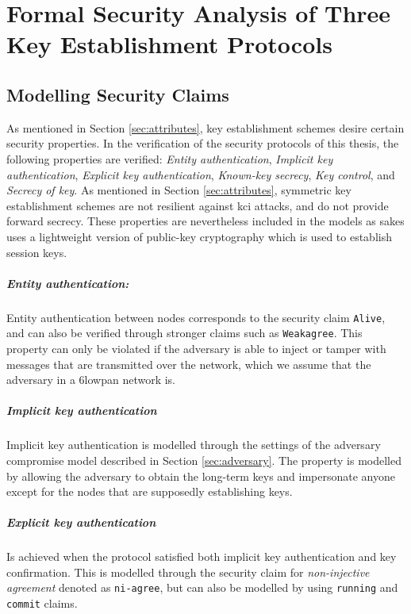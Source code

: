 \chapter{Formal Security Analysis of Three Key Establishment Protocols}
\label{chp:analysis}


\section{Modelling Security Claims}

As mentioned in Section \ref{sec:attributes}, key establishment schemes desire certain security properties. In the verification of the security protocols of this thesis, the following properties are verified: \emph{Entity authentication}, \emph{Implicit key authentication}, \emph{Explicit key authentication}, \emph{Known-key secrecy}, \emph{Key control}, and \emph{Secrecy of key}. As mentioned in Section \ref{sec:attributes}, symmetric key establishment schemes are not resilient against \gls{kci} attacks, and do not provide forward secrecy. These properties are nevertheless included in the models as \gls{sakes} uses a lightweight version of public-key cryptography which is used to establish session keys.

\paragraph{Entity authentication:} Entity authentication between nodes corresponds to the security claim \texttt{Alive}, and can also be verified through stronger claims such as \texttt{Weakagree}. This property can only be violated if the adversary is able to inject or tamper with messages that are transmitted over the network, which we assume that the adversary in a \gls{6lowpan} network is.

\paragraph{Implicit key authentication} Implicit key authentication is modelled through the settings of the adversary compromise model described in Section \ref{sec:adversary}. The property is modelled by allowing the adversary to obtain the long-term keys and impersonate anyone except for the nodes that are supposedly establishing keys.

\paragraph{Explicit key authentication} Is achieved when the protocol satisfied both implicit key authentication and key confirmation. This is modelled through the security claim for \emph{non-injective agreement} denoted as \texttt{ni-agree}, but can also be modelled by using \texttt{running} and \texttt{commit} claims.

